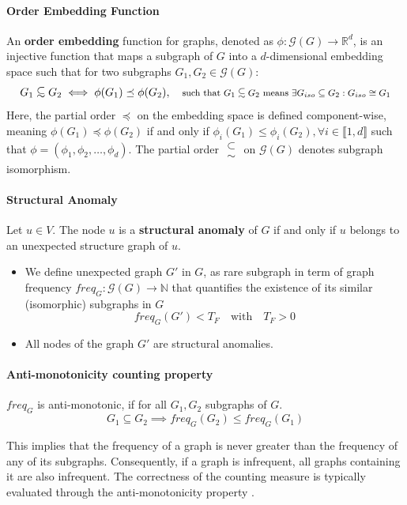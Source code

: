 \documentclass[pdflatex,sn-mathphys-num]{sn-jnl}%
\theoremstyle{thmstyleone}%
\theoremstyle{thmstyletwo}%
\theoremstyle{thmstylethree}%
\newcommand\subsetsim{\mathrel{\substack{
  \textstyle\subset\\[-0.2ex]\textstyle\sim}}}
\begin{document}
\paragraph{Order Embedding Function}
An \textbf{order embedding} function for graphs, denoted as $\phi:\mathcal{G}(G) \to \mathbb{R}^d$, is an injective function that maps a subgraph of $G$ into a $d$-dimensional embedding space such that for two subgraphs $G_1, G_2 \in \mathcal{G}(G)$:
\[
G_1 \subsetsim G_2 \iff \phi(G_1) \preceq \phi(G_2), \quad 
\text{\footnotesize such that $G_1 \subsetsim G_2$  means $\exists G_{iso} \subseteq G_2 : G_{iso} \cong G_1$}
\]
Here, the partial order $\preceq$ on the embedding space is defined component-wise, meaning $\phi(G_1) \preceq \phi(G_2)$ if and only if $\phi_i(G_1) \leq \phi_i(G_2), \forall i \in \llbracket 1, d \rrbracket$ such that $\phi = (\phi_1, \phi_2, \dots, \phi_d)$. The partial order $\subsetsim$ on $\mathcal{G}(G)$ denotes subgraph isomorphism.

\paragraph{Structural Anomaly}
Let $u \in V$. The node $u$ is a \textbf{structural anomaly} of $G$ if and only if $u$ belongs to an unexpected structure graph of $u$.
\begin{itemize}
 \item We define unexpected graph $G'$ in $G$, as rare subgraph in term of graph frequency $freq_G: \mathcal{G}(G) \to \mathbb{N} $ that quantifies the existence of its similar (isomorphic) subgraphs in $G$
 \[
  freq_G(G') < T_F \quad \text{with} \quad T_F > 0
 \]
 \item All nodes of the graph $G'$ are structural anomalies.
\end{itemize}

\paragraph{Anti-monotonicity counting property}
$freq_G$ is anti-monotonic, if for all $G_1, G_2$ subgraphs of $G$. \[G_1 \subseteq G_2 \implies freq_G(G_2) \le freq_G(G_1)\]

This implies that the frequency of a graph is never greater than the frequency of any of its subgraphs. Consequently, if a graph is infrequent, all graphs containing it are also infrequent. The correctness of the counting measure is typically evaluated through the anti-monotonicity property \cite{calders2008anti}. 
\end{document}
